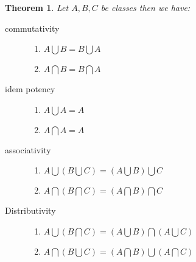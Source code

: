 \documentclass{book}
\newtheorem{theorem}{Theorem}
\begin{document}
\begin{theorem}
  \label{class class commutative,idempotent,associative,distributivity}Let $A,
  B, C$ be classes then we have:
  \begin{description}
    \item[commutativity]
    \begin{enumerate}
      \item $A \bigcup B = B \bigcup A$
      
      \item $A \bigcap B = B \bigcap A$
    \end{enumerate}
    \item[idem potency] 
    \begin{enumerate}
      \item $A \bigcup A = A$
      
      \item $A \bigcap A = A$
    \end{enumerate}
    \item[associativity] 
    \begin{enumerate}
      \item $A \bigcup \left( B \bigcup C \right) = \left( A \bigcup B \right)
      \bigcup C$
      
      \item $A \bigcap \left( B \bigcap C \right) = \left( A \bigcap B \right)
      \bigcap C$
    \end{enumerate}
    \item[Distributivity]
    \begin{enumerate}
      \item $A \bigcup \left( B \bigcap C \right) = \left( A \bigcup B \right)
      \bigcap \left( A \bigcup C \right)$
      
      \item $A \bigcap \left( B \bigcup C \right) = \left( A \bigcap B \right)
      \bigcup \left( A \bigcap C \right)$
    \end{enumerate}
  \end{description}
\end{theorem}
\end{document}
